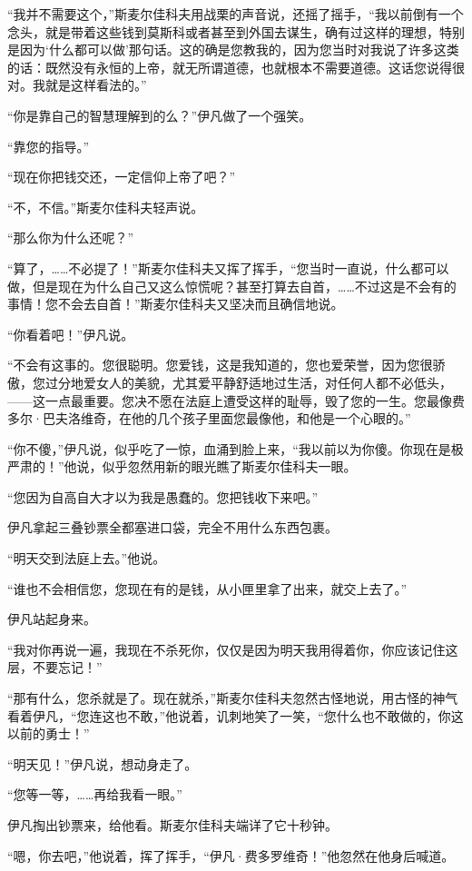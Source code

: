 \par “我并不需要这个，”斯麦尔佳科夫用战栗的声音说，还摇了摇手，“我以前倒有一个念头，就是带着这些钱到莫斯科或者甚至到外国去谋生，确有过这样的理想，特别是因为‘什么都可以做’那句话。这的确是您教我的，因为您当时对我说了许多这类的话：既然没有永恒的上帝，就无所谓道德，也就根本不需要道德。这话您说得很对。我就是这样看法的。”
\par “你是靠自己的智慧理解到的么？”伊凡做了一个强笑。
\par “靠您的指导。”
\par “现在你把钱交还，一定信仰上帝了吧？”
\par “不，不信。”斯麦尔佳科夫轻声说。
\par “那么你为什么还呢？”
\par “算了，……不必提了！”斯麦尔佳科夫又挥了挥手，“您当时一直说，什么都可以做，但是现在为什么自己又这么惊慌呢？甚至打算去自首，……不过这是不会有的事情！您不会去自首！”斯麦尔佳科夫又坚决而且确信地说。
\par “你看着吧！”伊凡说。
\par “不会有这事的。您很聪明。您爱钱，这是我知道的，您也爱荣誉，因为您很骄傲，您过分地爱女人的美貌，尤其爱平静舒适地过生活，对任何人都不必低头，——这一点最重要。您决不愿在法庭上遭受这样的耻辱，毁了您的一生。您最像费多尔·巴夫洛维奇，在他的几个孩子里面您最像他，和他是一个心眼的。”
\par “你不傻，”伊凡说，似乎吃了一惊，血涌到脸上来，“我以前以为你傻。你现在是极严肃的！”他说，似乎忽然用新的眼光瞧了斯麦尔佳科夫一眼。
\par “您因为自高自大才以为我是愚蠢的。您把钱收下来吧。”
\par 伊凡拿起三叠钞票全都塞进口袋，完全不用什么东西包裹。
\par “明天交到法庭上去。”他说。
\par “谁也不会相信您，您现在有的是钱，从小匣里拿了出来，就交上去了。”
\par 伊凡站起身来。
\par “我对你再说一遍，我现在不杀死你，仅仅是因为明天我用得着你，你应该记住这层，不要忘记！”
\par “那有什么，您杀就是了。现在就杀，”斯麦尔佳科夫忽然古怪地说，用古怪的神气看着伊凡，“您连这也不敢，”他说着，讥刺地笑了一笑，“您什么也不敢做的，你这以前的勇士！”
\par “明天见！”伊凡说，想动身走了。
\par “您等一等，……再给我看一眼。”
\par 伊凡掏出钞票来，给他看。斯麦尔佳科夫端详了它十秒钟。
\par “嗯，你去吧，”他说着，挥了挥手，“伊凡·费多罗维奇！”他忽然在他身后喊道。
